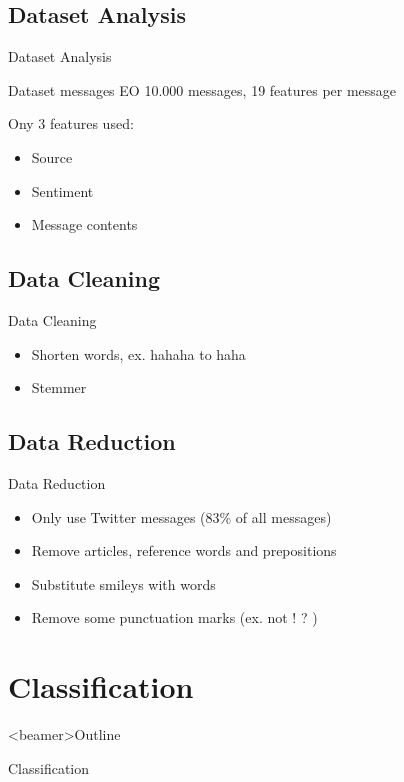 \documentclass{beamer}
\begin{document}
\subsection{Dataset Analysis}
\begin{frame}{Dataset Analysis}
\begin{block}{Dataset messages EO}
10.000 messages, 19 features per message
\end{block}
Ony 3 features used: \\
\begin{itemize}
\item Source
\item Sentiment
\item Message contents
\end{itemize}
\end{frame}


\subsection{Data Cleaning}
\begin{frame}{Data Cleaning}
\begin{itemize}
\item Shorten words, ex. hahaha to haha
\item Stemmer
\end{itemize}
\end{frame}

\subsection{Data Reduction}
\begin{frame}{Data Reduction}
\begin{itemize}
\item Only use Twitter messages (83\% of all messages)
\item Remove articles, reference words and prepositions
\item Substitute smileys with words
\item Remove some punctuation marks (ex. not ! ? )
\end{itemize}
\end{frame}

\section{Classification}
\begin{frame}<beamer>{Outline}
    \setcounter{tocdepth}{2}
    \tableofcontents[
    currentsubsection, 
    hideothersubsections, 
    sectionstyle=show/hide] 
  \end{frame}
\begin{frame}{Classification}
\end{frame}
\end{document}
